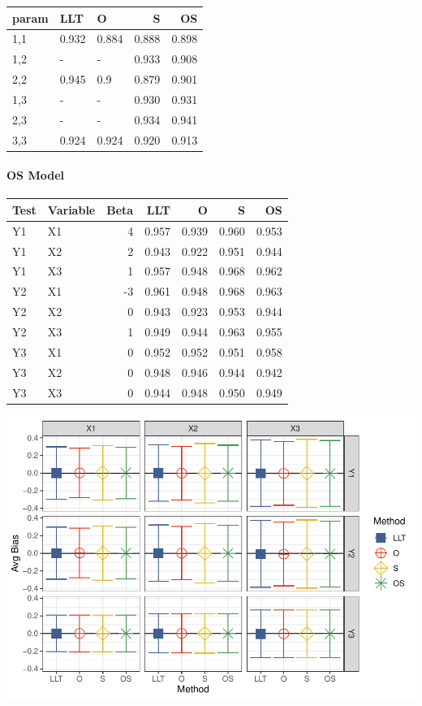 \documentclass[
]{article}
\begin{document}
\begin{longtable}[t]{l|l|l|r|r}
\hline
param & LLT & O & S & OS\\
\hline
1,1 & 0.932 & 0.884 & 0.888 & 0.898\\
\hline
1,2 & - & - & 0.933 & 0.908\\
\hline
2,2 & 0.945 & 0.9 & 0.879 & 0.901\\
\hline
1,3 & - & - & 0.930 & 0.931\\
\hline
2,3 & - & - & 0.934 & 0.941\\
\hline
3,3 & 0.924 & 0.924 & 0.920 & 0.913\\
\hline
\end{longtable}

\hypertarget{os-model-1}{%
\paragraph{OS Model}\label{os-model-1}}

\begin{longtable}[t]{l|l|r|r|r|r|r}
\hline
Test & Variable & Beta & LLT & O & S & OS\\
\hline
Y1 & X1 & 4 & 0.957 & 0.939 & 0.960 & 0.953\\
\hline
Y1 & X2 & 2 & 0.943 & 0.922 & 0.951 & 0.944\\
\hline
Y1 & X3 & 1 & 0.957 & 0.948 & 0.968 & 0.962\\
\hline
Y2 & X1 & -3 & 0.961 & 0.948 & 0.968 & 0.963\\
\hline
Y2 & X2 & 0 & 0.943 & 0.923 & 0.953 & 0.944\\
\hline
Y2 & X3 & 1 & 0.949 & 0.944 & 0.963 & 0.955\\
\hline
Y3 & X1 & 0 & 0.952 & 0.952 & 0.951 & 0.958\\
\hline
Y3 & X2 & 0 & 0.948 & 0.946 & 0.944 & 0.942\\
\hline
Y3 & X3 & 0 & 0.944 & 0.948 & 0.950 & 0.949\\
\hline
\end{longtable}

\includegraphics{FullSimulation_files/figure-latex/unnamed-chunk-25-1.pdf}
\end{document}
